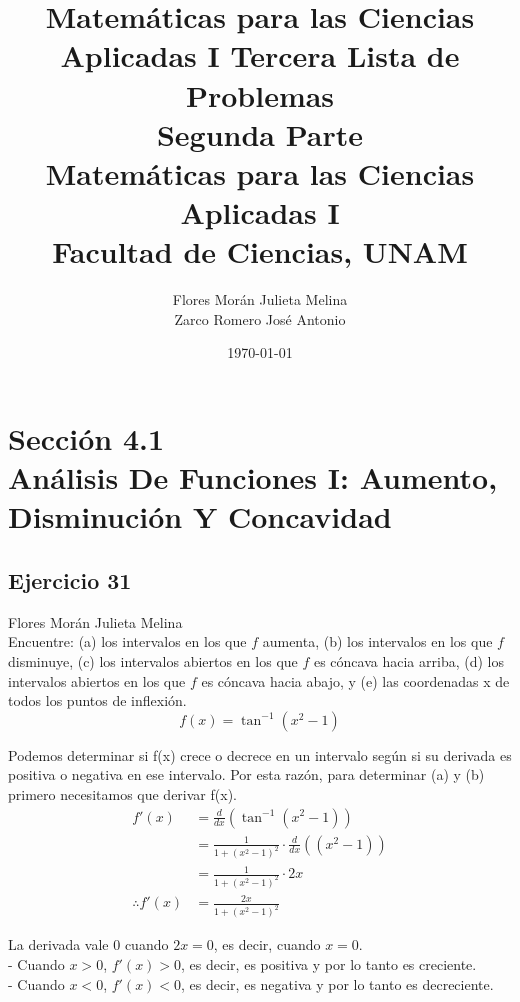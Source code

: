 \documentclass[12pt]{article}
\title{Matemáticas para las Ciencias Aplicadas I}
\title{
	Tercera Lista de Problemas \\
	\textbf{Segunda  Parte} \\
	\vspace{1ex}
	\large Matemáticas para las Ciencias Aplicadas I \\
	Facultad de Ciencias, UNAM}
\date{\today}
\author{Flores Morán Julieta Melina \\ Zarco Romero José Antonio}
\begin{document}
\maketitle


\section{Sección 4.1 \\ Análisis De Funciones I: Aumento, Disminución Y Concavidad}
\subsection{Ejercicio 31} Flores Morán Julieta Melina \\

Encuentre: (a) los intervalos en los que $f$ aumenta, (b) los intervalos en los que $f$ disminuye, (c) los intervalos abiertos en los que $f$ es cóncava hacia arriba, (d) los intervalos abiertos en los que $f$ es cóncava hacia abajo, y (e) las coordenadas x de todos los puntos de inflexión.
\[
f(x) = \tan^{-1}(x^2-1)
\]

 Podemos determinar si f(x) crece o decrece en un intervalo según si su derivada es positiva o negativa en ese intervalo. Por esta razón, para determinar (a) y (b) primero necesitamos que derivar f(x).
  \begin{equation*}
  \begin{split}
    f'(x)
    &= \frac{d}{dx}(\tan^{-1}(x^2-1)) \\
    &= \frac{1}{1+(x^{2}-1)^{2}} \cdot \frac{d}{dx}((x^{2}-1)) \\
    &= \frac{1}{1+(x^{2}-1)^{2}} \cdot 2x \\
    \therefore
    f'(x)
    &= \frac{2x}{1+(x^{2}-1)^{2}}
  \end{split}
  \end{equation*}

  La derivada vale $0$ cuando $2x = 0$, es decir, cuando $x=0$. \\
   - Cuando $x>0$, $f'(x)>0$, es decir, es positiva y por lo tanto es creciente. \\
  - Cuando $x<0$, $f'(x)<0$, es decir, es negativa y por lo tanto es decreciente.\\
\end{document}

